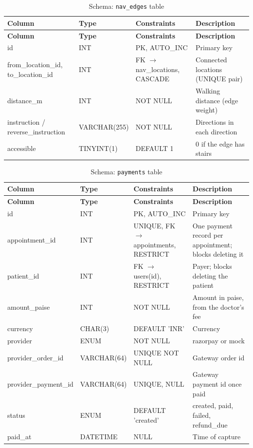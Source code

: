 \begin{longtable}{|L{3.3cm}|L{2.5cm}|L{2.4cm}|L{4.6cm}|}
\caption{Schema: \texttt{nav\_edges} table} \label{tab:navedge} \\
\hline
\textbf{Column} & \textbf{Type} & \textbf{Constraints} & \textbf{Description} \\
\hline
\endfirsthead
\hline
\textbf{Column} & \textbf{Type} & \textbf{Constraints} & \textbf{Description} \\
\hline
\endhead
\hline
\endfoot
id & INT & PK, AUTO\_INC & Primary key \\
\hline
from\_location\_id, to\_location\_id & INT & FK $\rightarrow$ nav\_locations, CASCADE & Connected locations (UNIQUE pair) \\
\hline
distance\_m & INT & NOT NULL & Walking distance (edge weight) \\
\hline
instruction / reverse\_instruction & VARCHAR(255) & NOT NULL & Directions in each direction \\
\hline
accessible & TINYINT(1) & DEFAULT 1 & 0 if the edge has stairs \\
\hline
\end{longtable}
\begin{longtable}{|L{3.3cm}|L{2.5cm}|L{2.4cm}|L{4.6cm}|}
\caption{Schema: \texttt{payments} table} \label{tab:payments} \\
\hline
\textbf{Column} & \textbf{Type} & \textbf{Constraints} & \textbf{Description} \\
\hline
\endfirsthead
\hline
\textbf{Column} & \textbf{Type} & \textbf{Constraints} & \textbf{Description} \\
\hline
\endhead
\hline
\endfoot
id & INT & PK, AUTO\_INC & Primary key \\
\hline
appointment\_id & INT & UNIQUE, FK $\rightarrow$ appointments, RESTRICT & One payment record per appointment; blocks deleting it \\
\hline
patient\_id & INT & FK $\rightarrow$ users(id), RESTRICT & Payer; blocks deleting the patient \\
\hline
amount\_paise & INT & NOT NULL & Amount in paise, from the doctor's fee \\
\hline
currency & CHAR(3) & DEFAULT 'INR' & Currency \\
\hline
provider & ENUM & NOT NULL & razorpay or mock \\
\hline
provider\_order\_id & VARCHAR(64) & UNIQUE NOT NULL & Gateway order id \\
\hline
provider\_payment\_id & VARCHAR(64) & UNIQUE, NULL & Gateway payment id once paid \\
\hline
status & ENUM & DEFAULT 'created' & created, paid, failed, refund\_due \\
\hline
paid\_at & DATETIME & NULL & Time of capture \\
\hline
\end{longtable}
